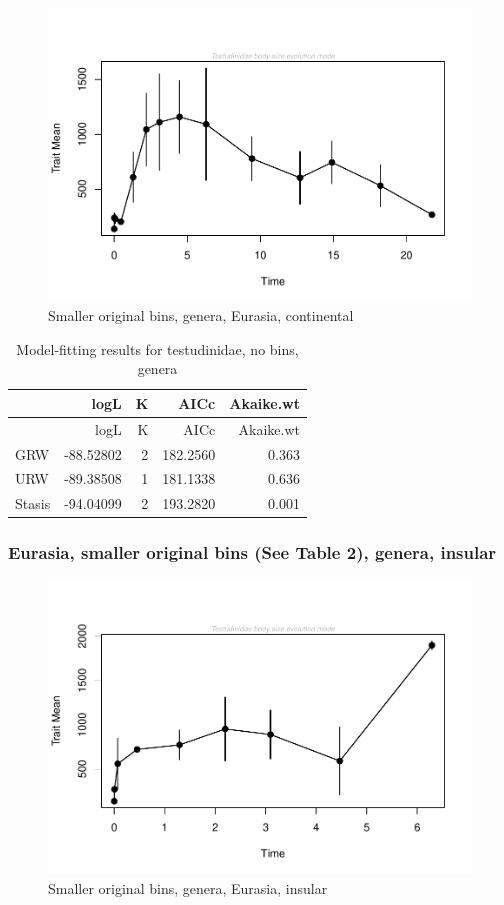 \documentclass[]{article}
\begin{document}
\begin{figure}[htbp]
\centering
\includegraphics{MA_JJ_files/figure-latex/paleoTS with different time bins, no bins, genera, Eurasia, continental-1.pdf}
\caption{Smaller original bins, genera, Eurasia, continental}
\end{figure}

\begin{longtable}[]{@{}lrrrr@{}}
\caption{Model-fitting results for testudinidae, no bins,
genera}\tabularnewline
\toprule
& logL & K & AICc & Akaike.wt\tabularnewline
\midrule
\endfirsthead
\toprule
& logL & K & AICc & Akaike.wt\tabularnewline
\midrule
\endhead
GRW & -88.52802 & 2 & 182.2560 & 0.363\tabularnewline
URW & -89.38508 & 1 & 181.1338 & 0.636\tabularnewline
Stasis & -94.04099 & 2 & 193.2820 & 0.001\tabularnewline
\bottomrule
\end{longtable}

\newpage 

\subsubsection{Eurasia, smaller original bins (See Table 2), genera,
insular}\label{eurasia-smaller-original-bins-see-table-2-genera-insular}

\begin{figure}[htbp]
\centering
\includegraphics{MA_JJ_files/figure-latex/paleoTS with different time bins, no bins, genera, Eurasia, insular-1.pdf}
\caption{Smaller original bins, genera, Eurasia, insular}
\end{figure}
\end{document}
